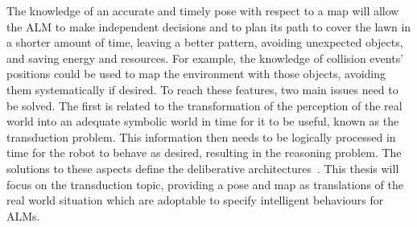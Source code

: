 The knowledge of an accurate and timely pose with respect to a map will allow the \gls{ALM} to make independent decisions and to plan its path to cover the lawn in a shorter amount of time, leaving a better pattern, avoiding unexpected objects, and saving energy and resources.
For example, the knowledge of collision events' positions could be used to map the environment with those objects, avoiding them systematically if desired.
To reach these features, two main issues need to be solved.
The first is related to the transformation of the perception of the real world into an adequate symbolic world in time for it to be useful, known as the transduction problem.
This information then needs to be logically processed in time for the robot to behave as desired, resulting in the reasoning problem.
The solutions to these aspects define the deliberative architectures~\cite{genesereth_logical_1987}. 
This thesis will focus on the transduction topic, providing a pose and map as translations of the real world situation which are adoptable to specify intelligent behaviours for \glspl{ALM}.  





